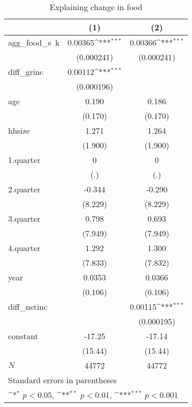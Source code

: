 \begin{table}[htbp]\centering
\def\sym#1{\ifmmode^{#1}\else\(^{#1}\)\fi}
\caption{\label{food\_deltacons} Explaining change in food}
\begin{tabular}{l*{2}{c}}
\hline\hline
            &\multicolumn{1}{c}{(1)}         &\multicolumn{1}{c}{(2)}         \\
\hline
agg\_food\_s~k&     0.00365\sym{***}&     0.00366\sym{***}\\
            &  (0.000241)         &  (0.000241)         \\
diff\_grinc  &     0.00112\sym{***}&                     \\
            &  (0.000196)         &                     \\
age         &       0.190         &       0.186         \\
            &     (0.170)         &     (0.170)         \\
hhsize      &       1.271         &       1.264         \\
            &     (1.900)         &     (1.900)         \\
1.quarter   &           0         &           0         \\
            &         (.)         &         (.)         \\
2.quarter   &      -0.344         &      -0.290         \\
            &     (8.229)         &     (8.229)         \\
3.quarter   &       0.798         &       0.693         \\
            &     (7.949)         &     (7.949)         \\
4.quarter   &       1.292         &       1.300         \\
            &     (7.833)         &     (7.832)         \\
year        &      0.0353         &      0.0366         \\
            &     (0.106)         &     (0.106)         \\
diff\_netinc &                     &     0.00115\sym{***}\\
            &                     &  (0.000195)         \\
constant    &      -17.25         &      -17.14         \\
            &     (15.44)         &     (15.44)         \\
\hline
\(N\)       &       44772         &       44772         \\
\hline\hline
\multicolumn{3}{l}{\footnotesize Standard errors in parentheses}\\
\multicolumn{3}{l}{\footnotesize \sym{*} \(p<0.05\), \sym{**} \(p<0.01\), \sym{***} \(p<0.001\)}\\
\end{tabular}
\end{table}
